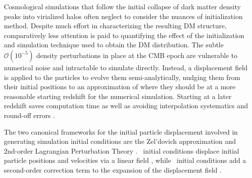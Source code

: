 Cosmological simulations that follow the initial collapse of dark matter density peaks into virialized halos often neglect to consider the nuances of initialization method.  Despite much effort in characterizing the resulting DM structure, comparatively less attention is paid to quantifying the effect of the initialization and simulation technique used to obtain the DM distribution.  The subtle $\mathcal{O}(10^{-5})$ density perturbations in place at the CMB epoch are vulnerable to numerical noise and intractable to simulate directly.  Instead, a displacement field is applied to the particles to evolve them semi-analytically, nudging them from their initial positions to an approximation of where they should be at a more reasonable starting redshift for the numerical simulation.  Starting at a later redshift saves computation time as well as avoiding interpolation systematics and round-off errors \citep{2007ApJ...671.1160L}.






The two canonical frameworks for the initial particle displacement involved in generating simulation initial conditions are the Zel'dovich approximation \citep[\za,][]{1970A&A.....5...84Z} and 2nd-order Lagrangian Perturbation Theory \citep[\lpt,][]{1994MNRAS.267..811B, 1994A&A...288..349B, 1995A&A...296..575B, 1998MNRAS.299.1097S}.  \za\ initial conditions displace initial particle positions and velocities via a linear field \citep{1983MNRAS.204..891K, 1985ApJS...57..241E}, while \lpt\ initial conditions add a second-order correction term to the expansion of the displacement field \citep{1998MNRAS.299.1097S, 2005ApJ...634..728S, 2010MNRAS.403.1859J}.

